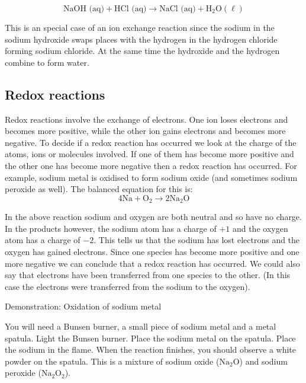 {{    \begin{equation*}
    \text{NaOH (aq)}+\text{HCl (aq)}\to \text{NaCl (aq)}+{\text{H}}_{2}\text{O} (\ell)
      \end{equation*}
\par \label{m38719*eip-588}This is an special case of an ion exchange reaction since the sodium in the sodium hydroxide swaps places with the hydrogen in the hydrogen chloride forming sodium chloride. At the same time the hydroxide and the hydrogen combine to form water. \par 
\label{m38719*eip-454}
            \subsection*{Redox reactions}
            \nopagebreak
            \label{m38719*eip-585}Redox reactions involve the exchange of electrons. One ion loses electrons and becomes more positive, while the other ion gains electrons and becomes more negative. To decide if a redox reaction has occurred we look at the charge of the atoms, ions or molecules involved. If one of them has become more positive and the other one has become more negative then a redox reaction has occurred. For example, sodium metal is oxidised to form sodium oxide (and sometimes sodium peroxide as well). The balanced equation for this is:
\label{m38719*id624}\nopagebreak\noindent{}
    \begin{equation*}
    4\text{Na}+{\text{O}}_{2}\to 2{\text{Na}}_{2}{\text{O}}
      \end{equation*}
\par \label{m38719*eip-815}In the above reaction sodium and oxygen are both neutral and so have no charge. In the products however, the sodium atom has a charge of $+1$ and the oxygen atom has a charge of $-2$. This tells us that the sodium has lost electrons and the oxygen has gained electrons. Since one species has become more positive and one more negative we can conclude that a redox reaction has occurred. We could also say that electrons have been transferred from one species to the other. (In this case the electrons were transferred from the sodium to the oxygen).\par \label{m38719*eip-878}
            \begin{g_experiment}{Demonstration: Oxidation of sodium metal}
            \nopagebreak
            \label{m38719*eip-355}
\begin{minipage}{.6\textwidth}
You will need a Bunsen burner, a small piece of sodium metal and a metal spatula. Light the Bunsen burner. Place the sodium metal on the spatula. Place the sodium in the flame. When the reaction finishes, you should observe a white powder on the spatula. This is a mixture of sodium oxide (${\text{Na}}_{2}\text{O}$) and sodium peroxide (${\text{Na}}_{2}{\text{O}}_{2}$). 

\end{minipage}
\end{g_experiment}}}
